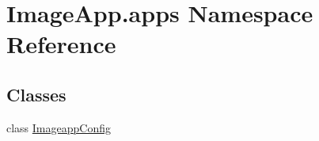 \hypertarget{namespace_image_app_1_1apps}{}\section{Image\+App.\+apps Namespace Reference}
\label{namespace_image_app_1_1apps}
\subsection*{Classes}
\begin{DoxyCompactItemize}
\item 
class \mbox{\hyperlink{class_image_app_1_1apps_1_1_imageapp_config}{Imageapp\+Config}}
\end{DoxyCompactItemize}
